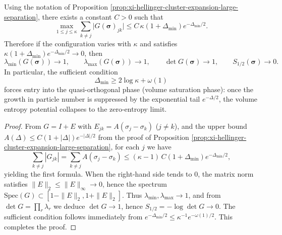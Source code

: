 \begin{corollary}\label{cor:xi-hellinger-quasi-orthogonal-phase}
Using the notation of Proposition \ref{prop:xi-hellinger-cluster-expansion-large-separation}, there exists a constant \(C>0\) such that
\[
\max_{1\le j\le \kappa}\sum_{k\neq j}\bigl|G(\boldsymbol{\sigma})_{jk}\bigr|
\le C\,\kappa(1+\Delta_{\min})e^{-\Delta_{\min}/2}.
\]
Therefore if the configuration varies with \(\kappa\) and satisfies \(\kappa(1+\Delta_{\min})e^{-\Delta_{\min}/2}\to 0\), then
\[
\lambda_{\min}(G(\boldsymbol{\sigma}))\to 1,\qquad
\lambda_{\max}(G(\boldsymbol{\sigma}))\to 1,\qquad
\det G(\boldsymbol{\sigma})\to 1,\qquad
S_{1/2}(\boldsymbol{\sigma})\to 0.
\]
In particular, the sufficient condition
\[
\Delta_{\min}\ge 2\log\kappa+\omega(1)
\]
forces entry into the quasi-orthogonal phase (volume saturation phase): once the growth in particle number is suppressed by the exponential tail \(e^{-\Delta/2}\), the volume entropy potential collapses to the zero-entropy limit.
\end{corollary}
\begin{proof}
From \(G=I+E\) with \(E_{jk}=A(\sigma_j-\sigma_k)\) (\(j\neq k\)), and the upper bound
\(
A(\Delta)\le C(1+|\Delta|)e^{-|\Delta|/2}
\)
from the proof of Proposition \ref{prop:xi-hellinger-cluster-expansion-large-separation},
for each \(j\) we have
\[
\sum_{k\neq j}|G_{jk}|=\sum_{k\neq j}A(\sigma_j-\sigma_k)\le (\kappa-1)\,C(1+\Delta_{\min})e^{-\Delta_{\min}/2},
\]
yielding the first formula.
When the right-hand side tends to \(0\), the matrix norm satisfies \(\|E\|_2\le \|E\|_\infty\to 0\), hence the spectrum \(\mathrm{Spec}(G)\subset [1-\|E\|_2,1+\|E\|_2]\).
Thus \(\lambda_{\min},\lambda_{\max}\to 1\), and from \(\det G=\prod_r\lambda_r\) we deduce \(\det G\to 1\), hence \(S_{1/2}=-\log\det G\to 0\).
The sufficient condition follows immediately from \(e^{-\Delta_{\min}/2}\le \kappa^{-1}e^{-\omega(1)/2}\). This completes the proof.
\end{proof}

